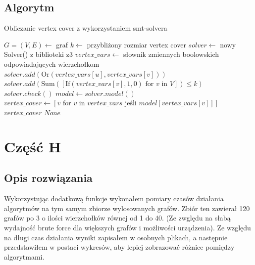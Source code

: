 \documentclass{article}
\begin{document}
\subsection{Algorytm}
\begin{algorithm}
\caption{Obliczanie vertex cover z wykorzystaniem smt-solvera}
\begin{algorithmic}[1]
\scriptsize
\STATE $G =  (V, E) \leftarrow$ graf
\STATE $k \leftarrow$ przybliżony rozmiar vertex cover
\STATE $solver \leftarrow$ nowy Solver() z biblioteki z3
\STATE $vertex\_vars \leftarrow$ słownik zmiennych boolowskich odpowiadających wierzchołkom
    \STATE $solver.add(\text{Or}(vertex\_vars[u], vertex\_vars[v]))$
\ENDFOR
\STATE $solver.add(\text{Sum}([\text{If}(vertex\_vars[v], 1, 0) \text{ for } v \text{ in } V]) \leq k)$
\STATE $solver.check()$
    \STATE $model \leftarrow solver.model()$
    \STATE $vertex\_cover \leftarrow [v \text{ for } v \text{ in } vertex\_vars \text{ jeśli } model[vertex\_vars[v]]]$
    \RETURN $vertex\_cover$
\ELSE
    \RETURN $None$
\ENDIF
\end{algorithmic}
\end{algorithm}


\vspace{2cm}
\section{Część H}
\subsection{Opis rozwiązania}
Wykorzystując dodatkową funkcje wykonałem pomiary czasów działania algorytmów na tym samym zbiorze wylosowanych grafów.
Zbiór ten zawierał 120 grafów po 3 o ilości wierzchołków równej od 1 do 40. (Ze zwględu na słabą wydajność brute force dla większych grafów i możliwości urządzenia).
Ze względu na długi czas działania wyniki zapisałem w osobnych plikach, a następnie przedstawiłem w postaci wykresów, aby lepiej zobrazować różnice pomiędzy algorytmami.
\end{document}
